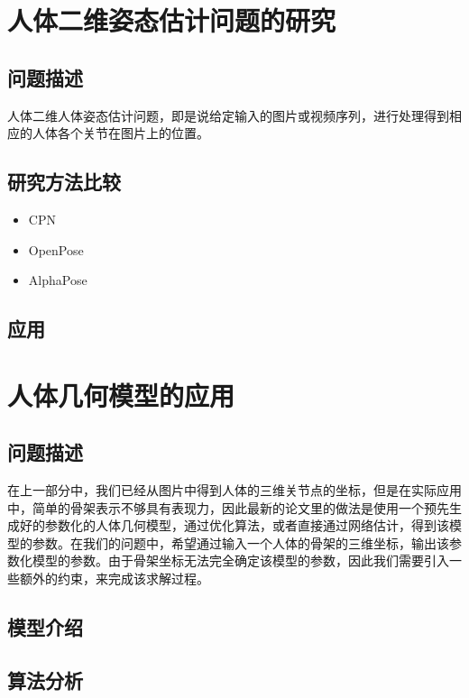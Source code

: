 \section{人体二维姿态估计问题的研究}
\subsection{问题描述}
人体二维人体姿态估计问题，即是说给定输入的图片或视频序列，进行处理得到相应的人体各个关节在图片上的位置。
\subsection{研究方法比较}
\begin{itemize}
    \item CPN 
    \item OpenPose
    \item AlphaPose
\end{itemize}

\subsection{应用}



\section{人体几何模型的应用}
\subsection{问题描述}
在上一部分中，我们已经从图片中得到人体的三维关节点的坐标，但是在实际应用中，简单的骨架表示不够具有表现力，因此最新的论文里的做法是使用一个预先生成好的参数化的人体几何模型，通过优化算法，或者直接通过网络估计，得到该模型的参数。在我们的问题中，希望通过输入一个人体的骨架的三维坐标，输出该参数化模型的参数。由于骨架坐标无法完全确定该模型的参数，因此我们需要引入一些额外的约束，来完成该求解过程。

\subsection{模型介绍}

\subsection{算法分析}

